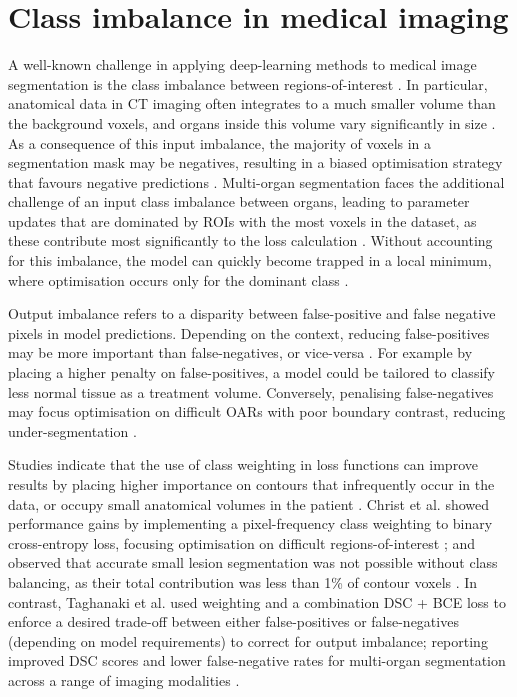 \section{Class imbalance in medical imaging}
A well-known challenge in applying deep-learning methods to medical image segmentation is the class imbalance between regions-of-interest \cite{Hesamian2019}. In particular, anatomical data in CT imaging often integrates to a much smaller volume than the background voxels, and organs inside this volume vary significantly in size \cite{taghanaki2018}. As a consequence of this input imbalance, the majority of voxels in a segmentation mask may be negatives, resulting in a biased optimisation strategy that favours negative predictions \cite{taghanaki2018}. Multi-organ segmentation faces the additional challenge of an input class imbalance between organs, leading to parameter updates that are dominated by ROIs with the most voxels in the dataset, as these contribute most significantly to the loss calculation \cite{Khan2019}. Without accounting for this imbalance, the model can quickly become trapped in a local minimum, where optimisation occurs only for the dominant class \cite{Khan2019}. 

Output imbalance refers to a disparity between false-positive and false negative pixels in model predictions. Depending on the context, reducing false-positives may be more important than false-negatives, or vice-versa \cite{taghanaki2018}. For example by placing a higher penalty on false-positives, a model could be tailored to classify less normal tissue as a treatment volume. Conversely, penalising false-negatives may focus optimisation on difficult OARs with poor boundary contrast, reducing under-segmentation \cite{taghanaki2018}.

Studies indicate that the use of class weighting in loss functions can improve results by placing higher importance on contours that infrequently occur in the data, or occupy small anatomical volumes in the patient \cite{taghanaki2018}. Christ et al. showed performance gains by implementing a pixel-frequency class weighting to binary cross-entropy loss, focusing optimisation on difficult regions-of-interest \cite{ferdin2017}; and observed that accurate small lesion segmentation was not possible without class balancing, as their total contribution was less than 1\% of contour voxels \cite{ferdin2017}. In contrast, Taghanaki et al. used weighting and a combination DSC + BCE loss to enforce a desired trade-off between either false-positives or false-negatives (depending on model requirements) to correct for output imbalance; reporting improved DSC scores and lower false-negative rates for multi-organ segmentation across a range of imaging modalities \cite{taghanaki2018}.


